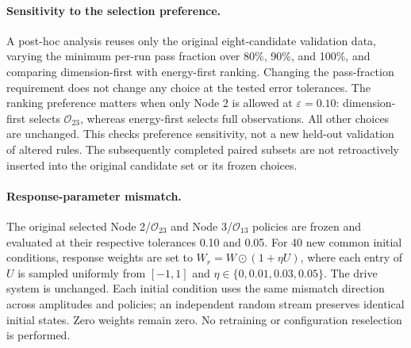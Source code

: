 \paragraph{Sensitivity to the selection preference.}
A post-hoc analysis reuses only the original eight-candidate validation data, varying the minimum per-run pass fraction over 80\%, 90\%, and 100\%, and comparing dimension-first with energy-first ranking. Changing the pass-fraction requirement does not change any choice at the tested error tolerances. The ranking preference matters when only Node 2 is allowed at $\varepsilon=0.10$: dimension-first selects $\mathcal O_{23}$, whereas energy-first selects full observations. All other choices are unchanged. This checks preference sensitivity, not a new held-out validation of altered rules. The subsequently completed paired subsets are not retroactively inserted into the original candidate set or its frozen choices.

\paragraph{Response-parameter mismatch.}
The original selected Node 2/$\mathcal O_{23}$ and Node 3/$\mathcal O_{13}$ policies are frozen and evaluated at their respective tolerances 0.10 and 0.05. For 40 new common initial conditions, response weights are set to $W_r=W\odot(1+\eta U)$, where each entry of $U$ is sampled uniformly from $[-1,1]$ and $\eta\in\{0,0.01,0.03,0.05\}$. The drive system is unchanged. Each initial condition uses the same mismatch direction across amplitudes and policies; an independent random stream preserves identical initial states. Zero weights remain zero. No retraining or configuration reselection is performed.

